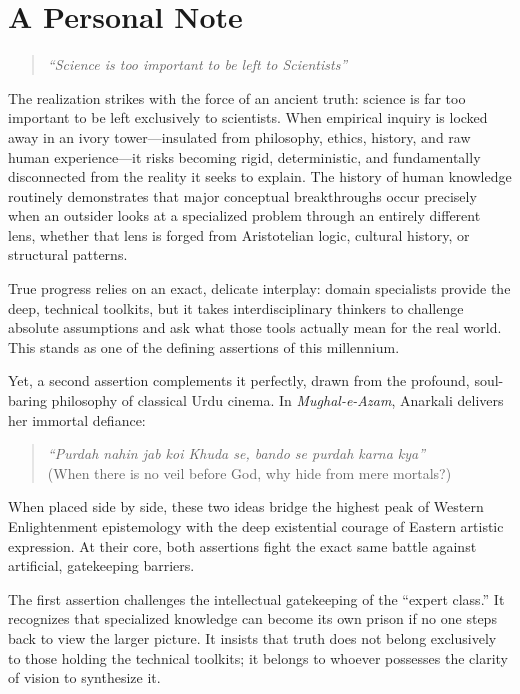 \section*{A Personal Note}
	
	\begin{quote}
		\textit{``Science is too important to be left to Scientists''} 
	\end{quote}
	
	The realization strikes with the force of an ancient truth: science is far too important to be left exclusively to scientists. When empirical inquiry is locked away in an ivory tower---insulated from philosophy, ethics, history, and raw human experience---it risks becoming rigid, deterministic, and fundamentally disconnected from the reality it seeks to explain. The history of human knowledge routinely demonstrates that major conceptual breakthroughs occur precisely when an outsider looks at a specialized problem through an entirely different lens, whether that lens is forged from Aristotelian logic, cultural history, or structural patterns.
	
	True progress relies on an exact, delicate interplay: domain specialists provide the deep, technical toolkits, but it takes interdisciplinary thinkers to challenge absolute assumptions and ask what those tools actually mean for the real world. This stands as one of the defining assertions of this millennium.
	
	Yet, a second assertion complements it perfectly, drawn from the profound, soul-baring philosophy of classical Urdu cinema. In \textit{Mughal-e-Azam}, Anarkali delivers her immortal defiance: 
	
	\begin{quote}
		\textit{``Purdah nahin jab koi Khuda se, bando se purdah karna kya''} \\
		(When there is no veil before God, why hide from mere mortals?)
	\end{quote}
	
	When placed side by side, these two ideas bridge the highest peak of Western Enlightenment epistemology with the deep existential courage of Eastern artistic expression. At their core, both assertions fight the exact same battle against artificial, gatekeeping barriers. 
	
	The first assertion challenges the intellectual gatekeeping of the ``expert class.'' It recognizes that specialized knowledge can become its own prison if no one steps back to view the larger picture. It insists that truth does not belong exclusively to those holding the technical toolkits; it belongs to whoever possesses the clarity of vision to synthesize it.
	
